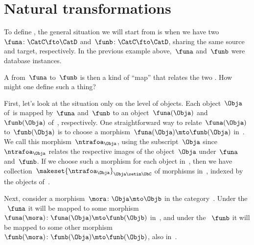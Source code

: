 \section{Natural transformations}

To define , the general situation we will start from is when we have two ~$\funa \colon \CatC \fto \CatD$ and~$\funb \colon \CatC \fto \CatD$, sharing the same source and target, respectively.
In the previous example above,~$\funa$ and~$\funb$ were database instances.

A  from~$\funa$ to~$\funb$ is then a kind of ``map'' that relates the two .
How might one define such a thing?

First, let's look at the situation only on the level of objects.
Each object~$\Obja$ of~\CatC is mapped by~$\funa$ and~$\funb$ to an object~$\funa(\Obja)$ and~$\funb(\Obja)$ of~\CatD, respectively.
One straightforward way to relate~$\funa(\Obja)$ to~$\funb(\Obja)$ is to choose a morphism~$\funa(\Obja) \mto \funb(\Obja)$ in~\CatD.
We call this morphism~$\ntrafoa_{\Obja}$, using the subscript~$\Obja$ since~$\ntrafoa_{\Obja}$ relates the respective images of the object~$\Obja$ under~$\funa$ and~$\funb$.
If we choose such a morphism for each object in~\CatC, then we have collection~$\makeset{ \ntrafoa_\Obja }_{\Obja \setin \ObC}$ of morphisms in~\CatD, indexed by the objects of~\CatC.

\begin{marginfigure}
    \hfill
\end{marginfigure}

Next, consider a morphism~$\mora \colon \Obja \mto \Objb$ in the category~\CatC.
Under the ~$\funa$ it will be mapped to some morphism~$\funa(\mora)\colon \funa(\Obja) \mto \funb(\Objb)$ in~\CatD, and under the ~$\funb$ it will be mapped to some other morphism~$\funb(\mora)\colon \funb(\Obja) \mto \funb(\Objb)$, also in~\CatD.

\vspace{5mm}
\begin{marginfigure}
    \hfill
\end{marginfigure}

